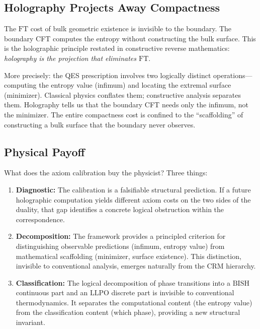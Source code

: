 \documentclass[11pt,a4paper]{article}
\theoremstyle{plain}
\theoremstyle{definition}
\newcommand{\LLPO}{\ensuremath{\mathrm{LLPO}}}
\newcommand{\BISH}{\ensuremath{\mathrm{BISH}}}
\newcommand{\FT}{\ensuremath{\mathrm{FT}}}
\begin{document}
\vspace{-6pt}
\subsection{Holography Projects Away Compactness}

The $\FT$ cost of bulk geometric existence is invisible to
the boundary.  The boundary CFT computes the entropy without
constructing the bulk surface.  This is the holographic principle
restated in constructive reverse mathematics: \emph{holography is
the projection that eliminates $\FT$}.

More precisely: the QES prescription involves two logically
distinct operations---computing the entropy value (infimum) and
locating the extremal surface (minimizer).  Classical physics
conflates them; constructive analysis separates them.  Holography
tells us that the boundary CFT needs only the infimum, not the
minimizer.  The entire compactness cost is confined to the
``scaffolding'' of constructing a bulk surface that the boundary
never observes.

\subsection{Physical Payoff}\label{sec:payoff}

What does the axiom calibration buy the physicist?
Three things:
\begin{enumerate}[nosep]
\item \textbf{Diagnostic:} The calibration is a falsifiable structural
  prediction.  If a future holographic computation yields different
  axiom costs on the two sides of the duality, that gap identifies a
  concrete logical obstruction within the correspondence.
\item \textbf{Decomposition:} The framework provides a principled
  criterion for distinguishing observable predictions (infimum, entropy
  value) from mathematical scaffolding (minimizer, surface existence).
  This distinction, invisible to conventional analysis, emerges
  naturally from the CRM hierarchy.
\item \textbf{Classification:} The logical decomposition of phase
  transitions into a $\BISH$ continuous part and an $\LLPO$ discrete
  part is invisible to conventional thermodynamics.  It separates the
  computational content (the entropy value) from the classification
  content (which phase), providing a new structural invariant.
\end{enumerate}
\end{document}
